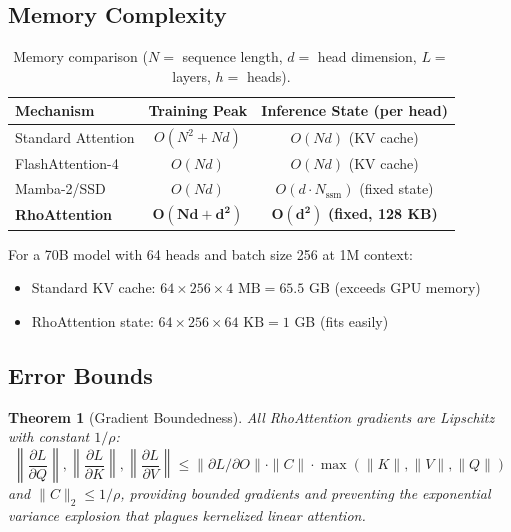 \documentclass[11pt,a4paper]{article}
\newtheorem{theorem}{Theorem}[section]
\theoremstyle{remark}
\begin{document}
\subsection{Memory Complexity}

\begin{table}[h]
\centering
\caption{Memory comparison ($N =$ sequence length, $d =$ head dimension, $L =$ layers, $h =$ heads).}
\begin{tabular}{lcc}
\toprule
\textbf{Mechanism} & \textbf{Training Peak} & \textbf{Inference State (per head)} \\
\midrule
Standard Attention & $O(N^2 + Nd)$ & $O(Nd)$ (KV cache) \\
FlashAttention-4 & $O(Nd)$ & $O(Nd)$ (KV cache) \\
Mamba-2/SSD & $O(Nd)$ & $O(d \cdot N_{\text{ssm}})$ (fixed state) \\
\textbf{RhoAttention} & $\mathbf{O(Nd + d^2)}$ & $\mathbf{O(d^2)}$ \textbf{(fixed, 128 KB)} \\
\bottomrule
\end{tabular}
\end{table}

For a 70B model with 64 heads and batch size 256 at 1M context:
\begin{itemize}
    \item Standard KV cache: $64 \times 256 \times 4\text{ MB} = 65.5$ GB (exceeds GPU memory)
    \item RhoAttention state: $64 \times 256 \times 64\text{ KB} = 1$ GB (fits easily)
\end{itemize}

\subsection{Error Bounds}

\begin{theorem}[Gradient Boundedness]
All RhoAttention gradients are Lipschitz with constant $1/\rho$:
\begin{equation}
\left\|\frac{\partial L}{\partial Q}\right\|, \left\|\frac{\partial L}{\partial K}\right\|, \left\|\frac{\partial L}{\partial V}\right\| \leq \|\partial L/\partial O\| \cdot \|C\| \cdot \max(\|K\|, \|V\|, \|Q\|)
\end{equation}
and $\|C\|_2 \leq 1/\rho$, providing bounded gradients and preventing the exponential variance explosion that plagues kernelized linear attention.
\end{theorem}
\end{document}
